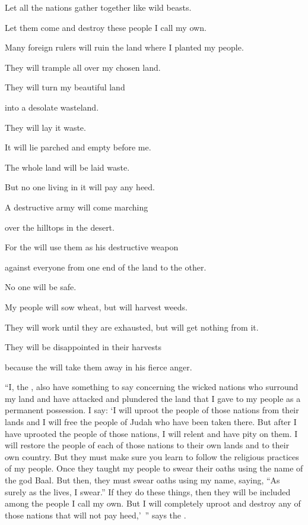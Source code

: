 {\par }{\Q Let
all
the nations gather together
like wild
beasts.
\par }{\Q Let them come
and destroy these people I call my own.
\par }{\Q {}Many
foreign rulers
will ruin
the land where I planted my people.
\par }{\Q They will trample all over
my chosen land.
\par }{\Q They will turn
my beautiful
land
\par }{\Q into a desolate
wasteland.
\par }{\Q {}They will lay
it waste.
\par }{\Q It will lie parched
and empty
before me.
\par }{\Q The whole
land
will be laid waste.
\par }{\Q But
no one
living
in it will pay
any heed.
\par }{\Q {}A destructive army
will come
marching
\par }{\Q over the hilltops
in the desert.
\par }{\Q For
the {}
will use them as his destructive
weapon

\par }{\Q against
everyone
from one end
of the land
to
the other.
\par }{\Q No
one
will be safe.
\par }{\Q {}My people will sow
wheat,
but will harvest
weeds.
\par }{\Q They will work until
they are exhausted,
but will get nothing
from it.
\par }{\Q They will be disappointed
in their harvests
\par }{\Q because the
{}
will take them away in his fierce
anger.
\par }{\PP {}“I, the
{}, also
have something
to say
concerning
the wicked
nations who surround
my land
and have
attacked and plundered
the land
that
I gave
to my people
as
a permanent possession.
I say: ‘I
will uproot
the
people of those nations
from
their lands
and I will free
the people of Judah
who have been
taken there.
But
after
I have uprooted
the people of those nations, I will relent
and have pity
on them. I will restore
the people
of each
of those nations to their own
lands and to their own
country.
But they must make sure you learn
to follow the religious
practices of my people.
Once
they taught
my people
to swear
their oaths using
the name of the god Baal.
But then,
they must swear
oaths using my name,
saying, “As surely
as the
{}
lives, I swear.” If they do these things,
then they will be included among
the people I call my own.
But I will completely uproot
and destroy
any of those nations
that
will not
pay heed,’ ”
says
the {}.

}
